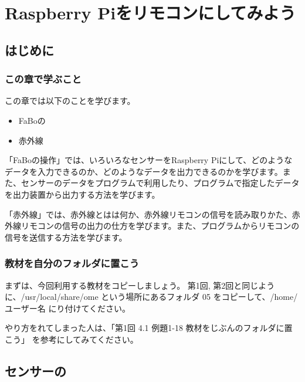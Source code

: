 \chapter{Raspberry Piをリモコンにしてみよう}
\section{はじめに}
\subsection{この章で学ぶこと}

この章では以下のことを学びます。
\begin{itemize}
\item FaBoの
\item 赤外線
\end{itemize}

「FaBoの操作」では、いろいろなセンサーをRaspberry Piにして、どのようなデータを入力できるのか、どのようなデータを出力できるのかを学びます。また、センサーのデータをプログラムで利用したり、プログラムで指定したデータを出力装置から出力する方法を学びます。

「赤外線」では、赤外線とはは何か、赤外線リモコンの信号を読み取りかた、赤外線リモコンの信号の出力の仕方を学びます。また、プログラムからリモコンの信号を送信する方法を学びます。

\subsection{教材を自分のフォルダに置こう}
まずは、今回利用する教材をコピーしましょう。
第1回, 第2回と同じように、\nobreak/usr/local/share/ome という場所にあるフォルダ 05 をコピーして、/home/ユーザー名 にり付けてください。

やり方をれてしまった人は、「第1回 4.1 例題1-18 教材をじぶんのフォルダに置こう」 を参考にしてみてください。


\section{センサーの}
